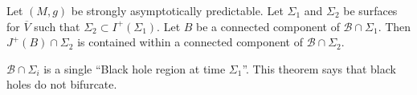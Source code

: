 \begin{theorem}[]
  Let $(M, g)$ be strongly asymptotically predictable. Let $\Sigma_1$ and $\Sigma_2$ be surfaces for $\overline{V}{}$ such that $\Sigma_2 \subset I^+(\Sigma_1)$. 
  Let $B$ be a connected component of $\mathcal{B} \cap \Sigma_1$. Then $J^+(B) \cap \Sigma_2$ is contained within a connected component of $\mathcal{B} \cap \Sigma_2$.
\end{theorem}
\begin{remark}
  $\mathcal{B} \cap \Sigma_i$ is a single ``Black hole region at time $\Sigma_1$''.
  This theorem says that black holes do not bifurcate.
\end{remark}
